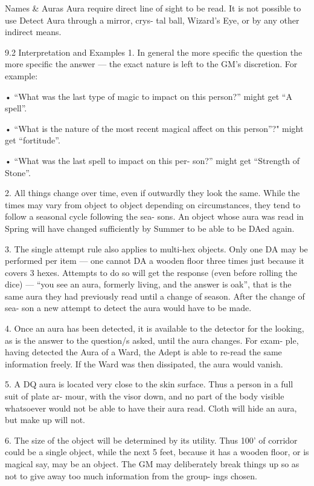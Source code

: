 \begin{Chapter}{Names \& Auras}
Aura require direct line of sight to be read. It is not 
possible to use Detect Aura through a mirror, crys-
tal  ball,  Wizard’s  Eye,  or  by  any  other  indirect 
means. 

9.2 Interpretation and Examples 
1.  In  general  the  more  specific  the  question  the 
more specific the answer — the exact nature is left 
to the GM’s discretion. For example:  

•    “What  was  the  last  type  of  magic  to  impact  on 
this person?” might get “A spell”.  

•    “What  is  the  nature  of  the  most  recent  magical 
affect on this person”?" might get “fortitude”.  

•    “What  was  the  last  spell  to  impact  on  this  per-
son?” might get “Strength of Stone”. 

2.  All  things  change  over  time,  even  if  outwardly 
they look the same. While the times may vary from 
object  to  object  depending  on  circumstances,  they 
tend  to  follow  a  seasonal  cycle  following  the  sea-
sons. An object whose aura was read in Spring will 
have changed sufficiently by Summer to be able to 
be DAed again. 

3. The single attempt rule also applies to multi-hex 
objects.  Only  one  DA  may  be  performed  per  item 
— one cannot DA a wooden floor three times just 
because  it  covers  3  hexes.  Attempts  to  do  so  will 
get  the  response  (even  before  rolling  the  dice)  — 
“you see an aura, formerly living, and the answer is 
oak”, that is the same aura they had previously read 
until  a  change  of  season.  After  the  change  of  sea-
son a new attempt to detect the aura would have to 
be made. 

4. Once an aura has been detected, it is available to 
the detector for the looking, as is the answer to the 
question/s asked, until the aura changes. For exam-
ple, having detected the Aura of a Ward, the Adept 
is able to re-read the same information freely. If the 
Ward was then dissipated, the aura would vanish. 

5.  A  DQ  aura  is  located  very  close  to  the  skin 
surface.  Thus  a  person  in  a  full  suit  of  plate  ar-
mour, with the visor down, and no part of the body 
visible whatsoever would not be able to have their 
aura read. Cloth will hide an aura, but make up will 
not. 

6. The size of the object will be determined by its 
utility.  Thus  100’  of  corridor  could  be  a  single 
object,  while  the  next  5  feet,  because  it  has  a 
wooden floor, or is magical say, may be an object. 
The GM may deliberately break things up so as not 
to give away too much information from the group-
ings chosen. 


\end{Chapter}
